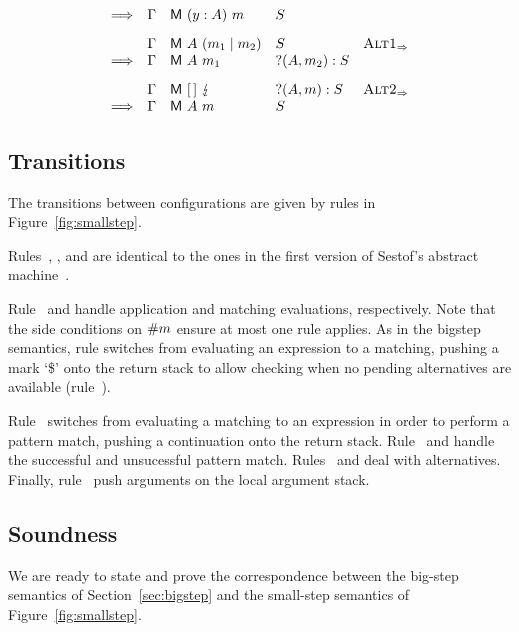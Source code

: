 \begin{figure*}
\[\begin{array}{rllll}
      \Longrightarrow & \Gamma & \textsf{M}~(y:A)~m  & S \\[2ex]
      & \Gamma & \textsf{M}~A~(m_1 \mid m_2) & S & \textsc{Alt1}_{\Rightarrow} \\
      \Longrightarrow & \Gamma & \textsf{M}~A~m_1   &?(A,m_2):S & \\[2ex]
  & \Gamma & \textsf{M}~[\,]~\lightning  & ?(A,m):S & \textsc{Alt2}_{\Rightarrow} \\
  \Longrightarrow & \Gamma & \textsf{M}~A~m  & S 
    \end{array}
  \]
    
  
  \caption{Abstract machine transition rules}\label{fig:smallstep}
\end{figure*}

\subsection{Transitions}

The transitions between configurations are given by rules in
Figure~\ref{fig:smallstep}.

Rules~, , 
and  are identical to the ones in the first version of
Sestof's abstract machine~\cite{sestof_1997}.

Rule~ and  handle application
and matching evaluations, respectively. Note that the
side conditions on $\#{m}$ ensure at most one
rule applies.
As in the bigstep semantics, rule  switches
from evaluating an expression to a
matching, pushing a mark `\$' onto the return stack
to allow checking when no pending alternatives
are available (rule~).

Rule~ switches from evaluating a matching
to an expression in order to perform a pattern match, pushing
a continuation onto the return stack.
Rule~ and  handle
the successful and unsucessful pattern match.
Rules~ and  deal
with alternatives.
Finally, rule~ push arguments on the local argument stack.


\subsection{Soundness}
We are ready to state and prove the correspondence between the big-step
semantics of Section~\ref{sec:bigstep} and the small-step semantics of
Figure~\ref{fig:smallstep}.

